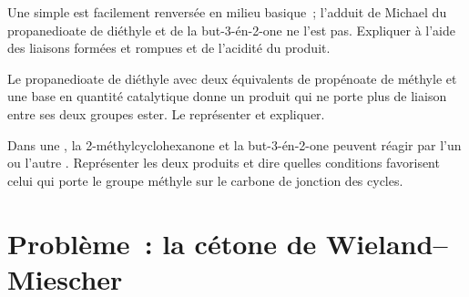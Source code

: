 \begin{exercise}[$\star\star\star$]\label{exo:b2:conjugate-additions:10}
Une  simple est facilement renversée en milieu basique~; l'adduit de Michael du
propanedioate de diéthyle et de la but-3-én-2-one ne l'est pas. Expliquer à l'aide des liaisons
formées et rompues et de l'acidité du produit.
\end{exercise}

\begin{exercise}[$\star\star\star$]\label{exo:b2:conjugate-additions:11}
Le propanedioate de diéthyle avec deux équivalents de propénoate de méthyle et une base en quantité
catalytique donne un produit qui ne porte plus de liaison  entre ses deux groupes ester. Le
représenter et expliquer.
\end{exercise}

\begin{exercise}[$\star\star\star$]\label{exo:b2:conjugate-additions:12}
Dans une , la 2-méthylcyclohexanone et la but-3-én-2-one peuvent réagir par
l'un ou l'autre . Représenter les deux produits et dire quelles conditions favorisent celui qui
porte le groupe méthyle sur le carbone de jonction des cycles.
\end{exercise}

\section{Problème~: la cétone de Wieland--Miescher}

